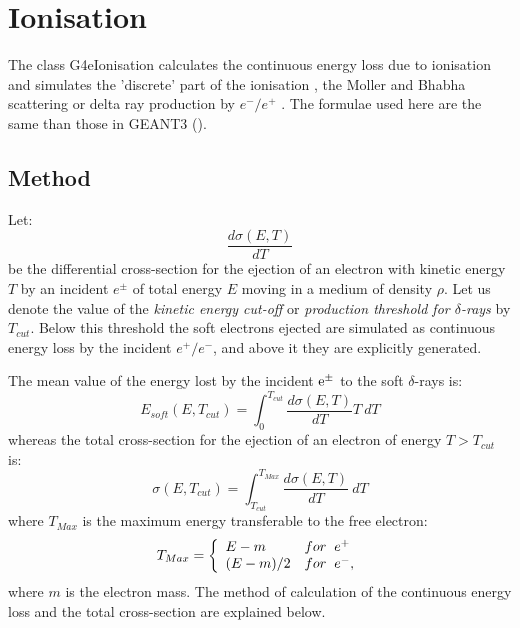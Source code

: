 \chapter[Ionisation]{Ionisation}
 

 The class G4eIonisation calculates the continuous energy loss
  due to ionisation and
 simulates the 'discrete' part of the ionisation , the Moller and Bhabha
scattering or delta ray production by $e^-/e^+$ . The formulae used here
 are the same than those in GEANT3 (\cite{eion.geant3}).

\section{Method}

Let: \[\frac{d\sigma(E,T)}{dT}\]
be the differential cross-section
for the ejection of an electron with kinetic energy $T$ by an incident
${e^{\pm}}$ of total energy $E$ moving in a medium of density $\rho$.
 Let us denote the value of the {\em kinetic energy cut-off} or
 {\em production threshold for $\delta$-rays} by  $T_{cut}$.
Below this threshold the soft
electrons ejected are simulated as continuous energy loss by the incident
$e^+/e^-$, and above it they are explicitly generated.

The mean value of the energy lost by the incident ${\rm e^{\pm}}$ to
the soft $\delta$-rays is:
\begin{equation}
E_{soft}(E,T_{cut})
= \int_{0}^{T_{cut}} \frac{d \sigma (E,T)}{dT} T \: dT  \label{eion.a}
\end{equation}
whereas the total cross-section for the ejection of
an electron of energy \linebreak $T > T_{cut}$ is:
\begin{equation}
\sigma (E,T_{cut})
= \int_{T_{cut}}^{T_{Max}}\frac{d \sigma (E,T)} {dT} \: dT \label{eion.b}
\end{equation}
where $T_{Max}$ is the maximum energy transferable to the free electron:
\begin{equation}
\label{eion.c}
T_{Max} = \left\{ \begin{array}{ll}
             E-m & {for \hspace{.2cm} e^+}  \\
             (E-m)/2 & {for \hspace{.2cm} e^- ,} \\
              \end{array} \right .
\end{equation}
where $m$ is the electron mass.
The method of calculation of the continuous energy loss
and the total cross-section are
explained below. 

